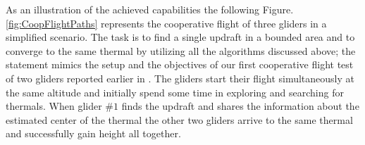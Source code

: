 \documentclass{ifacconf}
\begin{document}
%
%

As an illustration of the achieved capabilities the following Figure.\ref{fig:CoopFlightPaths} represents the cooperative flight of three gliders in a simplified scenario. The task is to find a single updraft in a bounded area and to converge to the same thermal by utilizing all the algorithms discussed above; the statement mimics the setup and the objectives of our first cooperative flight test of two gliders reported earlier in \cite{AKlass_JGCD:2012}. The gliders start their flight simultaneously at the same altitude and initially spend some time in exploring and searching for thermals. When glider $\#1$ finds the updraft and shares the information about the estimated center of the thermal the other two gliders arrive to the same thermal and successfully gain height all together.
\end{document}
